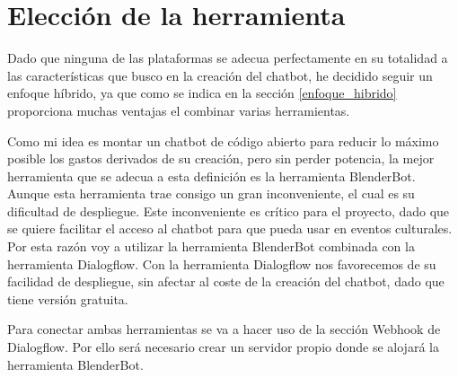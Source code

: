 \section{Elección de la herramienta}

Dado que ninguna de las plataformas se adecua perfectamente en su totalidad a las características que busco en la creación del chatbot, he decidido seguir un enfoque híbrido, ya que como se indica en la sección \ref{enfoque_hibrido} proporciona muchas ventajas el combinar varias herramientas.

Como mi idea es montar un chatbot de código abierto para reducir lo máximo posible los gastos derivados de su creación, pero sin perder potencia, la mejor herramienta que se adecua a esta definición es la herramienta BlenderBot. Aunque esta herramienta trae consigo un gran inconveniente, el cual es su dificultad de despliegue. Este inconveniente es crítico para el proyecto, dado que se quiere facilitar el acceso al chatbot para que pueda usar en eventos culturales. Por esta razón voy a utilizar la herramienta BlenderBot combinada con la herramienta Dialogflow. Con la herramienta Dialogflow nos favorecemos de su facilidad de despliegue, sin afectar al coste de la creación del chatbot, dado que tiene versión gratuita.

Para conectar ambas herramientas se va a hacer uso de la sección Webhook de Dialogflow. Por ello será necesario crear un servidor propio donde se alojará la herramienta BlenderBot.
